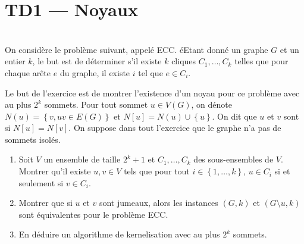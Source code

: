 \section{TD1 --- Noyaux}\label{sec:td1-noyaux}

\begin{td-exo}\,\\
    On consid\`ere le probl\`eme suivant, appel\'e ECC.
    \'eEtant donn\'e un graphe \(G\) et un entier \(k\), le but est de d\'eterminer s'il existe \(k\) cliques \(C_1,\ldots, C_k\) telles que pour chaque ar\^ete \(e\) du graphe, il existe \(i\) tel que \(e \in C_i\).

    Le but de l'exercice est de montrer l'existence d'un noyau pour ce probl\`eme avec au plus \(2^k\) sommets.
    Pour tout sommet \(u\in V(G)\), on d\'enote \(N(u) = \left\{ v, uv \in E(G) \right\}\) et \(N[u] = N(u) \cup \left\{ u \right\}\).
    On dit que \(u\) et \(v\) sont  si \(N[u] = N[v]\).
    On suppose dans tout l'exercice que le graphe n'a pas de sommets isol\'es.

    \begin{enumerate}
        \item Soit \(V\) un ensemble de taille \(2^k + 1\) et \(C_1,\ldots,C_k\) des sous-ensembles de \(V\).
        Montrer qu'il existe \(u, v \in V\) tels que pour tout \(i \in \left\{ 1,\ldots,k \right\}\), \(u \in C_i\) si et seulement si \(v \in C_i\).

        \item Montrer que si \(u\) et \(v\) sont jumeaux, alors les instances \((G, k)\) et \((G \setminus u, k)\) sont \'equivalentes pour le probl\`eme ECC.

        \item En d\'eduire un algorithme de kernelisation avec au plus \(2^k\) sommets.
    \end{enumerate}

\end{td-exo}


